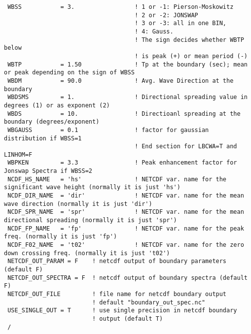 \documentclass[12pt]{amsart}
\begin{document}
\begin{verbatim}
 WBSS           = 3.                 ! 1 or -1: Pierson-Moskowitz
                                     ! 2 or -2: JONSWAP
                                     ! 3 or -3: all in one BIN,
                                     ! 4: Gauss.
                                     ! The sign decides whether WBTP below 
                                     ! is peak (+) or mean period (-)
 WBTP           = 1.50               ! Tp at the boundary (sec); mean or peak depending on the sign of WBSS
 WBDM           = 90.0               ! Avg. Wave Direction at the boundary
 WBDSMS         = 1.                 ! Directional spreading value in degrees (1) or as exponent (2)
 WBDS           = 10.                ! Directioanl spreading at the boundary (degrees/exponent)
 WBGAUSS        = 0.1                ! factor for gaussian distribution if WBSS=1
                                     ! End section for LBCWA=T and LINHOM=F
 WBPKEN         = 3.3                ! Peak enhancement factor for Jonswap Spectra if WBSS=2
 NCDF_HS_NAME   = 'hs'               ! NETCDF var. name for the significant wave height (normally it is just 'hs')
 NCDF_DIR_NAME  = 'dir'              ! NETCDF var. name for the mean wave direction (normally it is just 'dir')
 NCDF_SPR_NAME  = 'spr'              ! NETCDF var. name for the mean directional spreading (normally it is just 'spr')
 NCDF_FP_NAME   = 'fp'               ! NETCDF var. name for the peak freq. (normally it is just 'fp')
 NCDF_F02_NAME  = 't02'              ! NETCDF var. name for the zero down crossing freq. (normally it is just 't02')
 NETCDF_OUT_PARAM = F    ! netcdf output of boundary parameters (default F)
 NETCDF_OUT_SPECTRA = F  ! netcdf output of boundary spectra (default F)
 NETCDF_OUT_FILE         ! file name for netcdf boundary output
                         ! default "boundary_out_spec.nc"
 USE_SINGLE_OUT = T      ! use single precision in netcdf boundary
                         ! output (default T)
 /
\end{verbatim}
\end{document}
